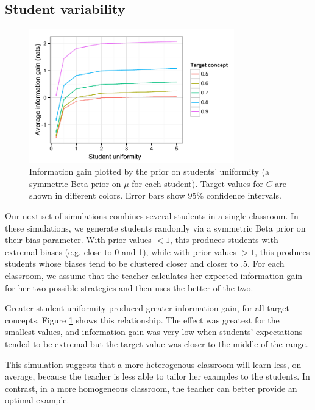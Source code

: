 \documentclass[10pt,letterpaper]{article}
\begin{document}
\subsection{Student variability}

\begin{figure}[t]
\begin{center}
\includegraphics[width=3.5in]{figures/student_uniformity.pdf}
\end{center}
\caption{\label{fig:uniformity} Information gain plotted by the prior on students' uniformity (a symmetric Beta prior on $\mu$ for each student). Target values for $C$ are shown in different colors. Error bars show 95\% confidence intervals.}
\end{figure}

Our next set of simulations combines several students in a single classroom. In these simulations, we generate students randomly via a symmetric Beta prior on their bias parameter. With prior values $< 1$, this produces students with extremal biases (e.g. close to 0 and 1), while with prior values $>1$, this produces students whose biases tend to be clustered closer and closer to .5. For each classroom, we assume that the teacher calculates her expected information gain for her two possible strategies and then uses the better of the two. 

Greater student uniformity produced greater information gain, for all target concepts. Figure \ref{fig:uniformity} shows this relationship. The effect was greatest for the smallest values, and information gain was very low when students' expectations tended to be extremal but the target value was closer to the middle of the range. 

This simulation suggests that a more heterogenous classroom will learn less, on average, because the teacher is less able to tailor her examples to the students. In contrast, in a more homogeneous classroom, the teacher can better provide an optimal example. 
\end{document}
